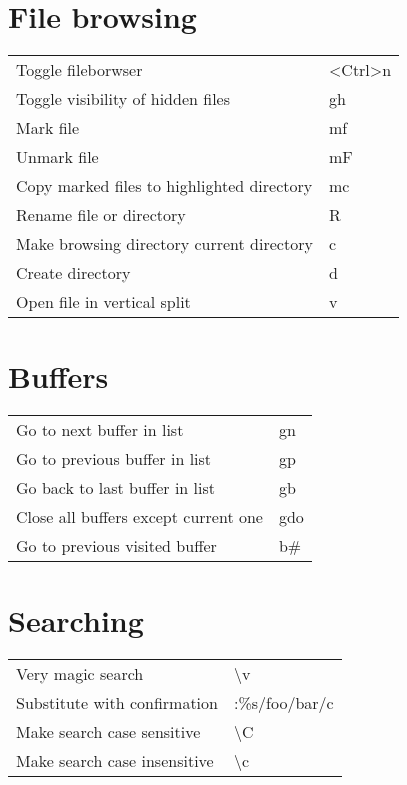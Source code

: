 \documentclass[a4paper]{report}
\def \tablewidth {10cm}
\begin{document}
\section{File browsing}
\begin{tabularx}{\tablewidth}{| X | l |}
  \hline
  Toggle fileborwser & \textless Ctrl\textgreater n \\
  Toggle visibility of hidden files & gh \\
  Mark file & mf \\
  Unmark file & mF \\
  Copy marked files to highlighted directory & mc \\
  Rename file or directory & R \\
  Make browsing directory current directory & c \\
  Create directory & d \\
  Open file in vertical split & v \\

  \hline
\end{tabularx}

\section{Buffers}
\begin{tabularx}{\tablewidth}{| X | l |}
  \hline
  Go to next buffer in list & gn \\
  Go to previous buffer in list & gp \\
  Go back to last buffer in list & gb \\
  Close all buffers except current one & gdo \\
  Go to previous visited buffer & b\# \\
  \hline
\end{tabularx}

\section{Searching}
\begin{tabularx}{\tablewidth}{| X | l |}
  \hline
  Very magic search & \textbackslash v \\
  Substitute with confirmation & :\%s/foo/bar/c \\
  Make search case sensitive & \textbackslash C \\
  Make search case insensitive & \textbackslash c \\
  \hline
\end{tabularx}
\end{document}
